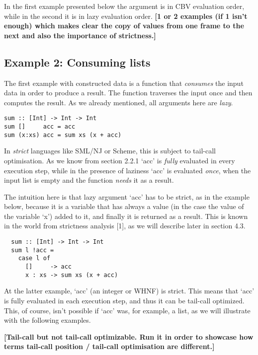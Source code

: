 \documentclass[diploma]{softlab-thesis}
\begin{document}
In the first example presented below the argument is in CBV evaluation order, 
while in the second it is in lazy evaluation order. \textbf{[1 or 2 examples (if 1 isn't enough) which makes clear the copy of values from 
one frame to the next and also the importance of strictness.]}


\subsection {Example 2: Consuming lists}

The first example with constructed data is a 
function that \textit{consumes} the input data in 
order to produce a result.  The function traverses 
the input once and then computes the result. As we 
already mentioned, all arguments here are \textit{lazy}.

\begin{verbatim}
sum :: [Int] -> Int -> Int
sum []     acc = acc
sum (x:xs) acc = sum xs (x + acc)
\end{verbatim}

In \textit{strict} languages like SML/NJ or Scheme,
this is subject to tail-call optimisation. As we know from section 2.2.1 
`acc' is \textit{fully} evaluated in every execution step, while in the
presence of laziness `acc' is evaluated \textit{once}, when the input 
list is empty and the function \textit{needs} it as a result.

The intuition here is that lazy argument `acc' has to be strict, as in the example below, 
because it is a variable that has always a value (in the case the value of the variable `x') added to it,
and finally it is returned as a result. This is known in the world from strictness analysis [1], as we 
will describe later in section 4.3.

\begin{verbatim}
  sum :: [Int] -> Int -> Int
  sum l !acc = 
    case l of 
      []     -> acc 
      x : xs -> sum xs (x + acc) 
\end{verbatim}

At the latter example, `acc' (an integer or WHNF) is strict. This means that `acc' is 
fully evaluated in each execution step, and thus it can be tail-call optimized. This, of course,
isn't possible if `acc' was, for example, a list, as we will illustrate with the following examples.

\textbf{[Tail-call but not tail-call optimizable. Run it in order to showcase how terms 
tail-call position / tail-call optimisation are different.]}
\end{document}
